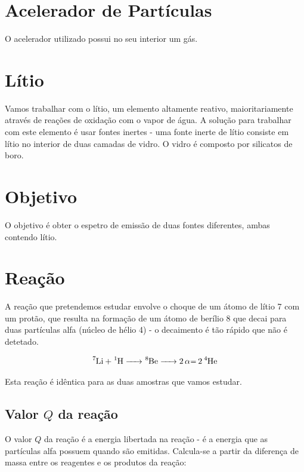 \documentclass{article}
\begin{document}
\begin{multicols}{2}

\section{Acelerador de Partículas}

O acelerador utilizado possui no seu interior um gás.

\section{Lítio}

Vamos trabalhar com o lítio, um elemento altamente reativo, maioritariamente através de reações de oxidação com o vapor de água. 
A solução para trabalhar com este elemento é usar fontes inertes - uma fonte inerte de lítio consiste em lítio no interior de duas camadas de vidro.
O vidro é composto por silicatos de boro.

\section{Objetivo}

O objetivo é obter o espetro de emissão de duas fontes diferentes, ambas contendo lítio. 

\section{Reação}

A reação que pretendemos estudar envolve o choque de um átomo de lítio 7 com um protão, que resulta na formação de um átomo de berílio 8 que decai para duas partículas alfa (núcleo de hélio 4) - o decaimento é tão rápido que não é detetado.

\begin{equation}
    \ce{^7Li + ^1H -> ^8Be -> 2\alpha = 2^4He}
\end{equation}

Esta reação é idêntica para as duas amostras que vamos estudar.

\subsection*{Valor $Q$ da reação}

O valor $Q$ da reação é a energia libertada na reação - é a energia que as partículas alfa possuem quando são emitidas.
Calcula-se a partir da diferença de massa entre os reagentes e os produtos da reação:


\end{multicols}
\end{document}
